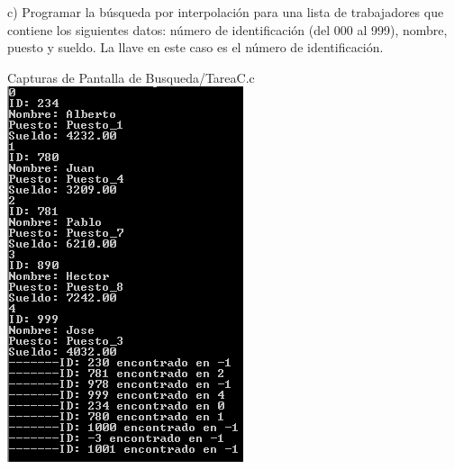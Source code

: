 c) Programar la búsqueda por interpolación para una
lista de trabajadores que contiene los siguientes datos:
número de identificación (del 000 al 999), nombre, puesto
y sueldo. La llave en este caso es el número de identificación.

Capturas de Pantalla de Busqueda/TareaC.c
\newline
\includegraphics{Busqueda/img/TareaC_1.png}
